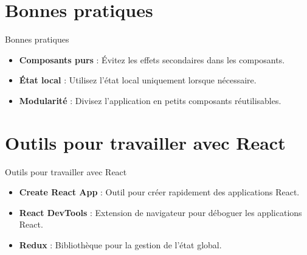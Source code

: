 \documentclass{clbeamer2024}
\begin{document}
	
	\section{Bonnes pratiques}
	\begin{frame}{Bonnes pratiques}
		\begin{itemize}
			\item \textbf{Composants purs} : Évitez les effets secondaires dans les composants.
			\item \textbf{État local} : Utilisez l'état local uniquement lorsque nécessaire.
			\item \textbf{Modularité} : Divisez l'application en petits composants réutilisables.
		\end{itemize}
	\end{frame}
	
	\section{Outils pour travailler avec React}
	\begin{frame}{Outils pour travailler avec React}
		\begin{itemize}
			\item \textbf{Create React App} : Outil pour créer rapidement des applications React.
			\item \textbf{React DevTools} : Extension de navigateur pour déboguer les applications React.
			\item \textbf{Redux} : Bibliothèque pour la gestion de l'état global.
		\end{itemize}
	\end{frame}
	
	
\end{document}
